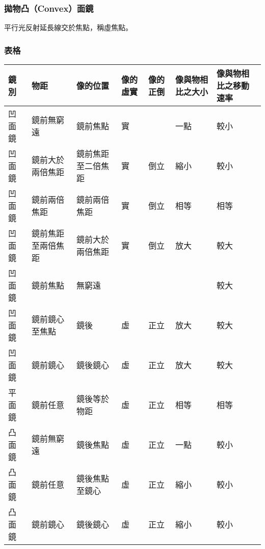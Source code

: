 \documentclass[a4paper,12pt]{report}
\begin{document}
\subsubsection{拋物凸（Convex）面鏡}
平行光反射延長線交於焦點，稱虛焦點。
\subsubsection{表格}
\bct\bfH\ctr
\begin{tabular}{|p{0.05\tw}|p{0.15\tw}|p{0.15\tw}|p{0.05\tw}|p{0.05\tw}|p{0.1\tw}|p{0.1\tw}|}
\hline
鏡別  & 物距        & 像的位置      & 像的虛實 & 像的正倒 & 像與物相比之大小 & 像與物相比之移動速率 \\\hline
凹面鏡 & 鏡前無窮遠     & 鏡前焦點      & 實    &      & 一點       & 較小         \\\hline
凹面鏡 & 鏡前大於兩倍焦距  & 鏡前焦距至二倍焦距 & 實    & 倒立   & 縮小       & 較小         \\\hline
凹面鏡 & 鏡前兩倍焦距    & 鏡前兩倍焦距    & 實    & 倒立   & 相等       & 相等         \\\hline
凹面鏡 & 鏡前焦距至兩倍焦距 & 鏡前大於兩倍焦距  & 實    & 倒立   & 放大       & 較大         \\\hline
凹面鏡 & 鏡前焦點      & 無窮遠       &      &      &          & 較大         \\\hline
凹面鏡 & 鏡前鏡心至焦點   & 鏡後        & 虛    & 正立   & 放大       & 較大         \\\hline
凹面鏡 & 鏡前鏡心      & 鏡後鏡心      & 虛    & 正立   & 放大       & 較大         \\\hline
平面鏡 & 鏡前任意      & 鏡後等於物距    & 虛    & 正立   & 相等       & 相等         \\\hline
凸面鏡 & 鏡前無窮遠     & 鏡後焦點      & 虛    & 正立   & 一點       & 較小         \\\hline
凸面鏡 & 鏡前任意      & 鏡後焦點至鏡心   & 虛    & 正立   & 縮小       & 較小         \\\hline
凸面鏡 & 鏡前鏡心      & 鏡後鏡心      & 虛    & 正立   & 縮小       & 較小  \\\hline      
\end{tabular}
\ef\FB\ect
\end{document}
